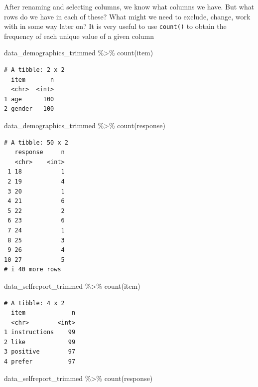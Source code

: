 \documentclass[
  letterpaper,
  DIV=11,
  numbers=noendperiod]{scrreprt}
\newenvironment{Shaded}{\begin{snugshade}}{\end{snugshade}}
\newcommand{\FunctionTok}[1]{\textcolor[rgb]{0.28,0.35,0.67}{#1}}
\newcommand{\NormalTok}[1]{\textcolor[rgb]{0.00,0.23,0.31}{#1}}
\newcommand{\SpecialCharTok}[1]{\textcolor[rgb]{0.37,0.37,0.37}{#1}}
\begin{document}
After renaming and selecting columns, we know what columns we have. But
what rows do we have in each of these? What might we need to exclude,
change, work with in some way later on? It is very useful to use
\texttt{count()} to obtain the frequency of each unique value of a given
column

\begin{Shaded}
\begin{Highlighting}[]
\NormalTok{data\_demographics\_trimmed }\SpecialCharTok{\%\textgreater{}\%}
  \FunctionTok{count}\NormalTok{(item)}
\end{Highlighting}
\end{Shaded}

\begin{verbatim}
# A tibble: 2 x 2
  item       n
  <chr>  <int>
1 age      100
2 gender   100
\end{verbatim}

\begin{Shaded}
\begin{Highlighting}[]
\NormalTok{data\_demographics\_trimmed }\SpecialCharTok{\%\textgreater{}\%}
  \FunctionTok{count}\NormalTok{(response)}
\end{Highlighting}
\end{Shaded}

\begin{verbatim}
# A tibble: 50 x 2
   response     n
   <chr>    <int>
 1 18           1
 2 19           4
 3 20           1
 4 21           6
 5 22           2
 6 23           6
 7 24           1
 8 25           3
 9 26           4
10 27           5
# i 40 more rows
\end{verbatim}

\begin{Shaded}
\begin{Highlighting}[]
\NormalTok{data\_selfreport\_trimmed }\SpecialCharTok{\%\textgreater{}\%}
  \FunctionTok{count}\NormalTok{(item)}
\end{Highlighting}
\end{Shaded}

\begin{verbatim}
# A tibble: 4 x 2
  item             n
  <chr>        <int>
1 instructions    99
2 like            99
3 positive        97
4 prefer          97
\end{verbatim}

\begin{Shaded}
\begin{Highlighting}[]
\NormalTok{data\_selfreport\_trimmed }\SpecialCharTok{\%\textgreater{}\%}
  \FunctionTok{count}\NormalTok{(response)}
\end{Highlighting}
\end{Shaded}
\end{document}
